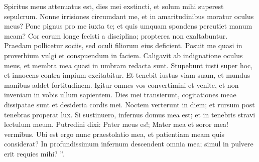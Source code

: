 \begin{biblechapter}
\begin{biblechapter}
\begin{biblechapter}
\begin{biblechapter}
\begin{biblechapter}
\begin{biblechapter}
\begin{biblechapter}
\begin{biblechapter}
\begin{biblechapter}
\begin{biblechapter}
\begin{biblechapter}
\begin{biblechapter}
\begin{biblechapter}
\begin{biblechapter}
\begin{biblechapter}
\begin{biblechapter}
\begin{biblechapter}
\verse Spiritus meus attenuatus est,
 dies mei exstincti,
 et solum mihi superest sepulcrum.
 \verse Nonne irrisiones circumdant me,
 et in amaritudinibus moratur oculus meus?
 \verse Pone pignus pro me iuxta te;
 et quis umquam spondens percutiet manum meam?
 \verse Cor eorum longe fecisti a disciplina;
 propterea non exaltabuntur.
 \verse Praedam pollicetur sociis,
 sed oculi filiorum eius deficient.
 \verse Posuit me quasi in proverbium vulgi
 et conspuendum in faciem.
 \verse Caligavit ab indignatione oculus meus,
 et membra mea quasi in umbram redacta sunt.
 \verse Stupebunt iusti super hoc,
 et innocens contra impium excitabitur.
 \verse Et tenebit iustus viam suam,
 et mundus manibus addet fortitudinem.
 \verse Igitur omnes vos convertimini et venite,
 et non inveniam in vobis ullum sapientem.
 \verse Dies mei transierunt, cogitationes meae dissipatae sunt
 et desideria cordis mei.
 \verse Noctem verterunt in diem;
 et rursum post tenebras properat lux.
 \verse Si sustinuero, infernus domus mea est;
 et in tenebris stravi lectulum meum.
 \verse Putredini dixi: Pater meus es!;
 Mater mea et soror mea! vermibus.
 \verse Ubi est ergo nunc praestolatio mea,
 et patientiam meam quis considerat?
 \verse In profundissimum infernum descendent omnia mea;
 simul in pulvere erit requies mihi? ”.
 

\end{biblechapter}
\end{biblechapter}
\end{biblechapter}
\end{biblechapter}
\end{biblechapter}
\end{biblechapter}
\end{biblechapter}
\end{biblechapter}
\end{biblechapter}
\end{biblechapter}
\end{biblechapter}
\end{biblechapter}
\end{biblechapter}
\end{biblechapter}
\end{biblechapter}
\end{biblechapter}
\end{biblechapter}

